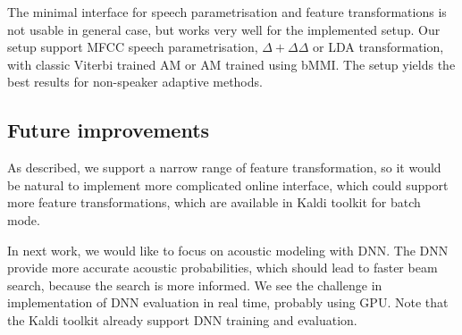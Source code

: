 The minimal interface for speech parametrisation and feature transformations is not usable in general case,
but works very well for the implemented setup.
Our setup support \ac{MFCC} speech parametrisation, $\Delta+\Delta\Delta$ or \ac{LDA} transformation, with
classic Viterbi trained \ac{AM} or \ac{AM} trained using \ac{bMMI}.
The setup yields the best results for non-speaker adaptive methods.

\subsection{Future improvements}
\label{sub:onl_future}
As described, we support a narrow range of feature transformation,
so it would be natural to implement more complicated online interface,
which could support more feature transformations, 
which are available in Kaldi toolkit for batch mode. 

In next work, we would like to focus on acoustic modeling with \acl{DNN}.
The \ac{DNN} provide more accurate acoustic probabilities, 
which should lead to faster beam search,
because the search is more informed.\cite{TODO_DNN} 
We see the challenge in implementation of \acl{DNN} evaluation in real time, probably using \ac{GPU}.
Note that the Kaldi toolkit already support \ac{DNN} training and evaluation.
